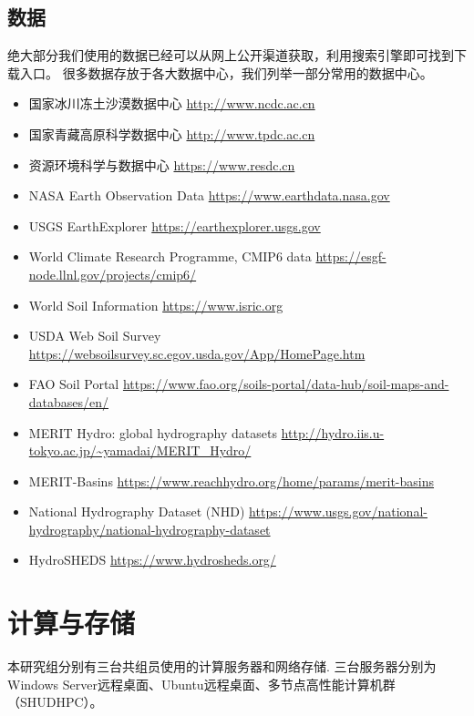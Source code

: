 \documentclass[
]{ctexbook}
\providecommand{\tightlist}{%
  \setlength{\itemsep}{0pt}\setlength{\parskip}{0pt}}
\begin{document}
\hypertarget{ux6570ux636e}{%
\section{数据}\label{ux6570ux636e}}

绝大部分我们使用的数据已经可以从网上公开渠道获取，利用搜索引擎即可找到下载入口。 很多数据存放于各大数据中心，我们列举一部分常用的数据中心。

\begin{itemize}
\tightlist
\item
  国家冰川冻土沙漠数据中心 \url{http://www.ncdc.ac.cn}
\item
  国家青藏高原科学数据中心 \url{http://www.tpdc.ac.cn}
\item
  资源环境科学与数据中心 \url{https://www.resdc.cn}
\item
  NASA Earth Observation Data \url{https://www.earthdata.nasa.gov}
\item
  USGS EarthExplorer \url{https://earthexplorer.usgs.gov}
\item
  World Climate Research Programme, CMIP6 data \url{https://esgf-node.llnl.gov/projects/cmip6/}
\item
  World Soil Information \url{https://www.isric.org}
\item
  USDA Web Soil Survey \url{https://websoilsurvey.sc.egov.usda.gov/App/HomePage.htm}
\item
  FAO Soil Portal \url{https://www.fao.org/soils-portal/data-hub/soil-maps-and-databases/en/}
\item
  MERIT Hydro: global hydrography datasets \url{http://hydro.iis.u-tokyo.ac.jp/~yamadai/MERIT_Hydro/}
\item
  MERIT-Basins \url{https://www.reachhydro.org/home/params/merit-basins}
\item
  National Hydrography Dataset (NHD) \url{https://www.usgs.gov/national-hydrography/national-hydrography-dataset}
\item
  HydroSHEDS \url{https://www.hydrosheds.org/}
\end{itemize}

\hypertarget{servers}{%
\chapter{计算与存储}\label{servers}}

本研究组分别有三台共组员使用的计算服务器和网络存储.
三台服务器分别为Windows Server远程桌面、Ubuntu远程桌面、多节点高性能计算机群（SHUDHPC）。
\end{document}

